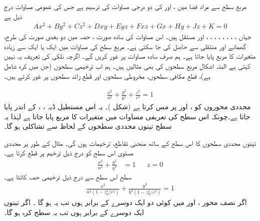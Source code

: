 مربع سطح سے مراد فضا میں    ،  اور  کی دو درجی مساوات کی  ترسیم ہے جس  کی عمومی مساوات درج ذیل ہے
\begin{align*}
Ax^2+By^2+Cz^2+Dxy+Eyz+Fxz+Gx+Hy+Jz+K=0
\end{align*}
جہاں ، ، ، ، ، ، ، ،   اور  مستقل ہیں۔ اس مساوات کی سادہ صورت  ، حصہ   میں دو بعدی صورت کی طرح، گھمانے اور منتقلی سے حاصل کی جا سکتی ہے۔ مربع سطح کی مساوات میں ایک یا ایک سے زیادہ متغیرات کا مربع پایا جاتا ہے۔  ہم صرف سادہ مساوات پر غور کریں گے۔ اگرچہ نلکی کی تعریف   یہ نہیں کہتی ہے البتہ اشکال مربع سطحوں کی بھی مثالیں   ہیں۔ ہم اب  ترخیمی سطحوں (جن میں کرہ شامل ہے)،  قطع مکافی  سطحوں،  مخروطی  سطحوں اور قطع زائد سطحوں  پر غور کرتے ہیں۔

\begin{align}
\frac{x^2}{a^2}+\frac{y^2}{b^2}+\frac{z^2}{c^2}=1
\end{align}
  محددی محوروں کو ،  اور  پر مس کرتا ہے (شکل )۔ یہ اس مستطیل ڈبہ  ،
  ،   کے اندر پایا جاتا ہے۔چونکہ اس سطح کی تعریفی مساوات میں متغیرات کا مربع پایا جاتا ہے لہٰذا   یہ سطح تینوں محددی سطحوں کے لحاظ سے تشاکلی  ہو گا۔

تینوں محددی سطحوں کا اس سطح کے ساتھ منحنی تقاطع،   ترخیمات ہوں گی۔ مثال کے طور پر محددی مستوی   اس سطح کو درج ذیل ترخیم پر قطع کرتا ہے۔
\begin{align*}
\frac{x^2}{a^2}+\frac{y^2}{b^2}&=1&&z=0
\end{align*}
سطح   اس سطح سے درج ذیل  ترخیمی حصہ کاٹتا ہے۔
\begin{align*}
\frac{x^2}{a^2(1-z_0^2/c^2)}+\frac{y^2}{b^2(1-z_0^2/c^2)}=1
\end{align*}
اگر نصف محور ،  اور  میں  کوئی دو ایک دوسرے کے برابر ہوں تب یہ ہو گا ۔  اگر تینوں ایک دوسرے کے برابر ہوں تب یہ  سطح  کرہ ہو گا۔

